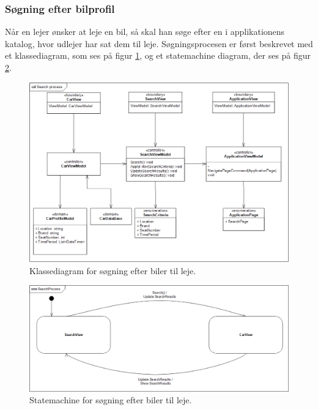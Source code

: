 \documentclass[Arkitektur/System_main.tex]{subfiles}
\begin{document}
\subsubsection{Søgning efter bilprofil}
Når en lejer ønsker at leje en bil, så skal han søge efter en i applikationens katalog, hvor udlejer har sat dem til leje. Søgningsprocesen er først beskrevet med et klassediagram, som ses på figur \ref{fig:SearchProcessCD}, og et statemachine diagram, der ses på figur \ref{fig:SearchProcessSTM}.
\begin{figure}[H]
    \centering
    \includegraphics[width=1\textwidth]{Arkitektur/Softwarearkitektur/Searching/graphics/SearchProcessCD.png}
    \caption{Klassediagram for søgning efter biler til leje. }
    \label{fig:SearchProcessCD}
\end{figure}

\begin{figure}[H]
    \centering
    \includegraphics[width=1\textwidth]{Arkitektur/Softwarearkitektur/Searching/graphics/SearchProcessSTM.png}
    \caption{Statemachine for søgning efter biler til leje. }
    \label{fig:SearchProcessSTM}
\end{figure}
\end{document}

